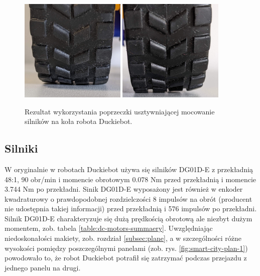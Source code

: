 \documentclass{svproc}
\begin{document}
\begin{figure}[ht!]
    \centering
    \includegraphics[width=0.45\textwidth]{wheel-contact-1.jpg}
    \includegraphics[width=0.45\textwidth]{wheel-contact-2.jpg}
    \caption{Rezultat wykorzystania poprzeczki usztywniającej mocowanie silników na koła robota Duckiebot.}
    \label{fig:wheel-contact}
\end{figure}

\subsection{Silniki}
W oryginalnie w robotach Duckiebot używa się silników DG01D-E z przekładnią 48:1, 90 obr/min i momencie obrotowym 0.078 Nm przed przekładnią i momencie 3.744 Nm po przekładni.
Sinik DG01D-E wyposażony jest również w enkoder kwadraturowy o prawdopodobnej rozdzielczości 8 impulsów na obrót (producent nie udostępnia takiej informacji) przed przekładnią i 576 impulsów po przekładni. Silnik DG01D-E charakteryzuje się dużą prędkością obrotową ale niezbyt dużym momentem, zob. tabela \ref{table:dc-motors-summaery}. Uwzględniając niedoskonałości makiety, zob. rozdział \ref{subsec:plane}, a w szczególności różne wysokości pomiędzy poszczególnymi panelami (zob. rys. \ref{fig:smart-city-plan-1}) powodowało to, że robot Duckiebot potrafił się zatrzymać podczas przejazdu z jednego panelu na drugi.
\end{document}
